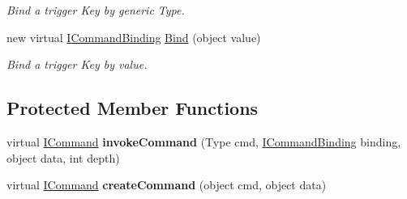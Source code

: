 \begin{DoxyCompactItemize}
\begin{DoxyCompactList}\small\item\em Bind a trigger Key by generic Type. \end{DoxyCompactList}\item 
\hypertarget{classstrange_1_1extensions_1_1command_1_1impl_1_1_command_binder_a63849fed5502d91b346caab1e0fe9a43}{new virtual \hyperlink{interfacestrange_1_1extensions_1_1command_1_1api_1_1_i_command_binding}{I\-Command\-Binding} \hyperlink{classstrange_1_1extensions_1_1command_1_1impl_1_1_command_binder_a63849fed5502d91b346caab1e0fe9a43}{Bind} (object value)}\label{classstrange_1_1extensions_1_1command_1_1impl_1_1_command_binder_a63849fed5502d91b346caab1e0fe9a43}

\begin{DoxyCompactList}\small\item\em Bind a trigger Key by value. \end{DoxyCompactList}\end{DoxyCompactItemize}
\subsection*{Protected Member Functions}
\begin{DoxyCompactItemize}
\item 
\hypertarget{classstrange_1_1extensions_1_1command_1_1impl_1_1_command_binder_a6ac0eaf086a6425a54492846f858703d}{virtual \hyperlink{interfacestrange_1_1extensions_1_1command_1_1api_1_1_i_command}{I\-Command} {\bfseries invoke\-Command} (Type cmd, \hyperlink{interfacestrange_1_1extensions_1_1command_1_1api_1_1_i_command_binding}{I\-Command\-Binding} binding, object data, int depth)}\label{classstrange_1_1extensions_1_1command_1_1impl_1_1_command_binder_a6ac0eaf086a6425a54492846f858703d}

\item 
\hypertarget{classstrange_1_1extensions_1_1command_1_1impl_1_1_command_binder_afcde1b363255b70ed9f84c7f90d139d4}{virtual \hyperlink{interfacestrange_1_1extensions_1_1command_1_1api_1_1_i_command}{I\-Command} {\bfseries create\-Command} (object cmd, object data)}\label{classstrange_1_1extensions_1_1command_1_1impl_1_1_command_binder_afcde1b363255b70ed9f84c7f90d139d4}

\end{DoxyCompactItemize}
